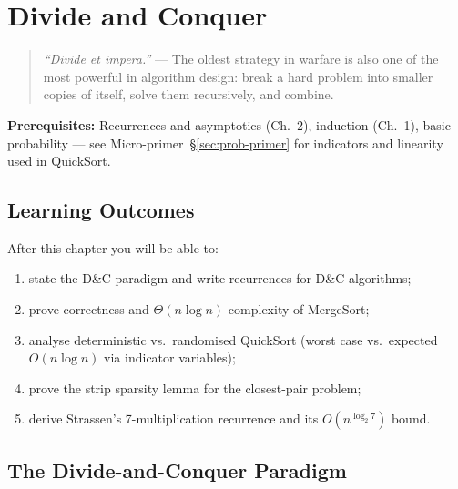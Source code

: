 \chapter{Divide and Conquer}
\label{ch:divide-conquer}

\begin{quote}
\emph{``Divide et impera.''} --- The oldest strategy in warfare is also one of the most powerful in algorithm design: break a hard problem into smaller copies of itself, solve them recursively, and combine.
\end{quote}

\noindent\textbf{Prerequisites:} Recurrences and asymptotics (Ch.~2), induction (Ch.~1), basic probability --- see Micro-primer~\S\ref{sec:prob-primer} for indicators and linearity used in QuickSort.

\section*{Learning Outcomes}
After this chapter you will be able to:
\begin{enumerate}[label=(L\arabic*)]
    \item state the D\&C paradigm and write recurrences for D\&C algorithms;
    \item prove correctness and $\Theta(n\log n)$ complexity of MergeSort;
    \item analyse deterministic vs.\ randomised QuickSort (worst case vs.\ expected $O(n\log n)$ via indicator variables);
    \item prove the strip sparsity lemma for the closest-pair problem;
    \item derive Strassen's 7-multiplication recurrence and its $O(n^{\log_2 7})$ bound.
\end{enumerate}

\section{The Divide-and-Conquer Paradigm}
\label{sec:dc-paradigm}

